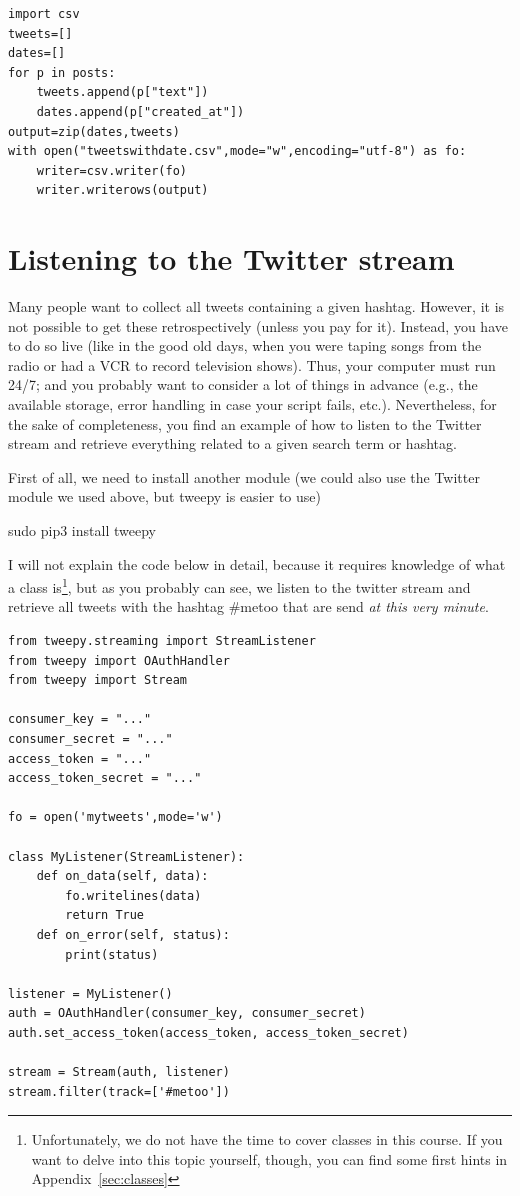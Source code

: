 \documentclass[a4paper,12pt]{book}
\begin{document}
\begin{lstlisting}
import csv
tweets=[]
dates=[]
for p in posts:
	tweets.append(p["text"])
	dates.append(p["created_at"])
output=zip(dates,tweets)
with open("tweetswithdate.csv",mode="w",encoding="utf-8") as fo:
	writer=csv.writer(fo)
	writer.writerows(output) 
\end{lstlisting}


\section{Listening to the Twitter stream}

Many people want to collect all tweets containing a given hashtag.
However, it is not possible to get these retrospectively (unless you pay for it). 
Instead, you have to do so live (like in the good old days, when you were taping songs from the radio or had a VCR to record television shows).
Thus, your computer must run 24/7; and you probably want to consider a lot of things in advance (e.g., the available storage, error handling in case your script fails, etc.).
Nevertheless, for the sake of completeness, you find an example of how to listen to the Twitter stream and retrieve everything related to a given search term or hashtag.

First of all, we need to install another module (we could also use the Twitter module we used above, but tweepy is easier to use)
\begin{lstlistingbash}
sudo pip3 install tweepy
\end{lstlistingbash}	

I will not explain the code below in detail, because it requires knowledge of what a class is\footnote{Unfortunately, we do not have the time to cover classes in this course. If you want to delve into this topic yourself, though, you can find some first hints in Appendix~\ref{sec:classes}}, but as you probably can see, we listen to the twitter stream and retrieve all tweets with the hashtag \#metoo that are send \emph{at this very minute}.

\begin{lstlisting}
from tweepy.streaming import StreamListener
from tweepy import OAuthHandler
from tweepy import Stream

consumer_key = "..."
consumer_secret = "..."
access_token = "..."
access_token_secret = "..."

fo = open('mytweets',mode='w')

class MyListener(StreamListener):
    def on_data(self, data):
        fo.writelines(data)
        return True
    def on_error(self, status):
        print(status)

listener = MyListener()
auth = OAuthHandler(consumer_key, consumer_secret)
auth.set_access_token(access_token, access_token_secret)

stream = Stream(auth, listener)
stream.filter(track=['#metoo'])
\end{lstlisting}
\end{document}
